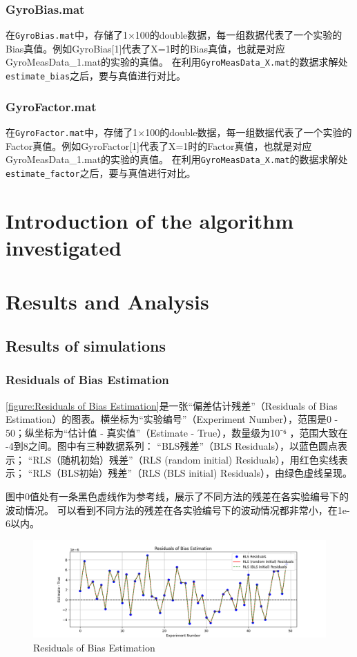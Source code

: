 \documentclass[openany,12pt,UTF8]{ctexart}
\begin{document}
\subsubsection{GyroBias.mat}
在\texttt{GyroBias.mat}中，存储了1×100的double数据，每一组数据代表了一个实验的Bias真值。例如GyroBias[1]代表了X=1时的Bias真值，也就是对应GyroMeasData\_1.mat的实验的真值。
在利用\texttt{GyroMeasData\_X.mat}的数据求解处\texttt{estimate\_{bias}}之后，要与真值进行对比。
\subsubsection{GyroFactor.mat}
在\texttt{GyroFactor.mat}中，存储了1×100的double数据，每一组数据代表了一个实验的Factor真值。例如GyroFactor[1]代表了X=1时的Factor真值，也就是对应GyroMeasData\_1.mat的实验的真值。
在利用\texttt{GyroMeasData\_X.mat}的数据求解处\texttt{estimate\_{factor}}之后，要与真值进行对比。


\section{Introduction of the algorithm investigated}

\section{Results and Analysis}

\subsection{Results of simulations}
\subsubsection{Residuals of Bias Estimation}
\autoref{figure:Residuals of Bias Estimation}是一张“偏差估计残差”（Residuals of Bias Estimation）的图表。横坐标为“实验编号”（Experiment Number），范围是0 - 50；纵坐标为“估计值 - 真实值”（Estimate - True），数量级为10⁻⁶ ，范围大致在 -4到8之间。图中有三种数据系列：
“BLS残差”（BLS Residuals），以蓝色圆点表示；
“RLS（随机初始）残差”（RLS (random initial) Residuals），用红色实线表示；
“RLS（BLS初始）残差”（RLS (BLS initial) Residuals），由绿色虚线呈现。

图中0值处有一条黑色虚线作为参考线，展示了不同方法的残差在各实验编号下的波动情况。 可以看到不同方法的残差在各实验编号下的波动情况都非常小，在1e-6以内。
\begin{figure}[h]\centering
    \includegraphics[width=\columnwidth]{figures/Residuals of Bias Estimation.png}
    \caption{Residuals of Bias Estimation}
    \label{figure:Residuals of Bias Estimation}
\end{figure}
\end{document}
